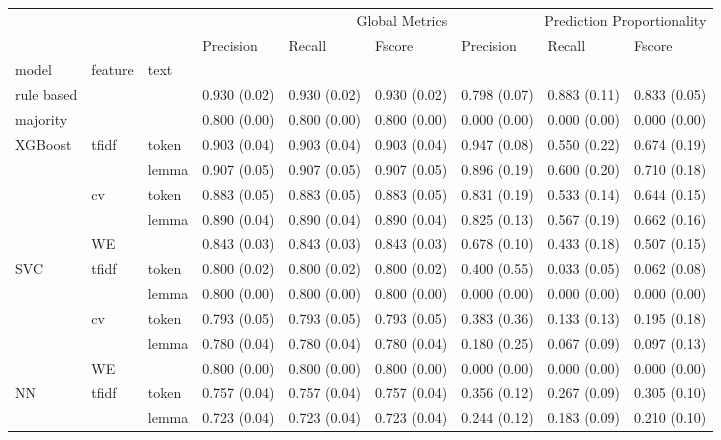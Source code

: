 \begin{tabular}{lllllllll}
 &  &  & \multicolumn{3}{r}{Global Metrics} & \multicolumn{3}{r}{Prediction Proportionality} \\
 &  &  & Precision & Recall & Fscore & Precision & Recall & Fscore \\
model & feature & text &  &  &  &  &  &  \\
rule based &  &  & 0.930 (0.02) & 0.930 (0.02) & 0.930 (0.02) & 0.798 (0.07) & 0.883 (0.11) & 0.833 (0.05) \\
majority &  &  & 0.800 (0.00) & 0.800 (0.00) & 0.800 (0.00) & 0.000 (0.00) & 0.000 (0.00) & 0.000 (0.00) \\
\multirow[c]{5}{*}{XGBoost} & \multirow[c]{2}{*}{tfidf} & token & 0.903 (0.04) & 0.903 (0.04) & 0.903 (0.04) & 0.947 (0.08) & 0.550 (0.22) & 0.674 (0.19) \\
 &  & lemma & 0.907 (0.05) & 0.907 (0.05) & 0.907 (0.05) & 0.896 (0.19) & 0.600 (0.20) & 0.710 (0.18) \\
 & \multirow[c]{2}{*}{cv} & token & 0.883 (0.05) & 0.883 (0.05) & 0.883 (0.05) & 0.831 (0.19) & 0.533 (0.14) & 0.644 (0.15) \\
 &  & lemma & 0.890 (0.04) & 0.890 (0.04) & 0.890 (0.04) & 0.825 (0.13) & 0.567 (0.19) & 0.662 (0.16) \\
 & WE &  & 0.843 (0.03) & 0.843 (0.03) & 0.843 (0.03) & 0.678 (0.10) & 0.433 (0.18) & 0.507 (0.15) \\
\multirow[c]{5}{*}{SVC} & \multirow[c]{2}{*}{tfidf} & token & 0.800 (0.02) & 0.800 (0.02) & 0.800 (0.02) & 0.400 (0.55) & 0.033 (0.05) & 0.062 (0.08) \\
 &  & lemma & 0.800 (0.00) & 0.800 (0.00) & 0.800 (0.00) & 0.000 (0.00) & 0.000 (0.00) & 0.000 (0.00) \\
 & \multirow[c]{2}{*}{cv} & token & 0.793 (0.05) & 0.793 (0.05) & 0.793 (0.05) & 0.383 (0.36) & 0.133 (0.13) & 0.195 (0.18) \\
 &  & lemma & 0.780 (0.04) & 0.780 (0.04) & 0.780 (0.04) & 0.180 (0.25) & 0.067 (0.09) & 0.097 (0.13) \\
 & WE &  & 0.800 (0.00) & 0.800 (0.00) & 0.800 (0.00) & 0.000 (0.00) & 0.000 (0.00) & 0.000 (0.00) \\
\multirow[c]{5}{*}{NN} & \multirow[c]{2}{*}{tfidf} & token & 0.757 (0.04) & 0.757 (0.04) & 0.757 (0.04) & 0.356 (0.12) & 0.267 (0.09) & 0.305 (0.10) \\
 &  & lemma & 0.723 (0.04) & 0.723 (0.04) & 0.723 (0.04) & 0.244 (0.12) & 0.183 (0.09) & 0.210 (0.10) \\

\end{tabular}
